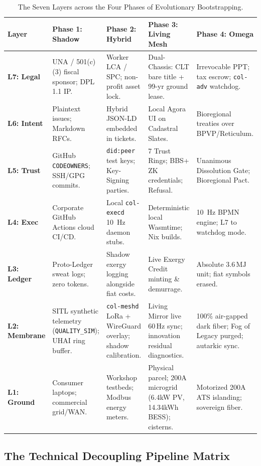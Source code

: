 \begin{table}[htbp]
\centering
\small
\setlength{\tabcolsep}{3pt}
\begin{tabular}{|p{}|p{}|p{}|p{}|p{}|}
\hline
\textbf{Layer} & \textbf{Phase 1: Shadow} & \textbf{Phase 2: Hybrid} & \textbf{Phase 3: Living Mesh} & \textbf{Phase 4: Omega} \\
\hline
\textbf{L7: Legal} & UNA / 501(c)(3) fiscal sponsor; DPL 1.1 IP. & Worker LCA / SPC; non-profit asset lock. & Dual-Chassis: CLT bare title + 99-yr ground lease. & Irrevocable PPT; tax escrow; \texttt{col-adv} watchdog. \\
\hline
\textbf{L6: Intent} & Plaintext issues; Markdown RFCs. & Hybrid JSON-LD embedded in tickets. & Local Agora UI on Cadastral Slates. & Bioregional treaties over BPVP/Reticulum. \\
\hline
\textbf{L5: Trust} & GitHub \texttt{CODEOWNERS}; SSH/GPG commits. & \texttt{did:peer} test keys; Key-Signing parties. & 7 Trust Rings; BBS+ ZK credentials; Refusal. & Unanimous Dissolution Gate; Bioregional Pact. \\
\hline
\textbf{L4: Exec} & Corporate GitHub Actions cloud CI/CD. & Local \texttt{col-execd} 10~Hz daemon stubs. & Deterministic local Wasmtime; Nix builds. & 10~Hz BPMN engine; L7 to watchdog mode. \\
\hline
\textbf{L3: Ledger} & Proto-Ledger sweat logs; zero tokens. & Shadow exergy logging alongside fiat costs. & Live Exergy Credit minting \& demurrage. & Absolute $3.6\,\mathrm{MJ}$ unit; fiat symbols erased. \\
\hline
\textbf{L2: Membrane} & SITL synthetic telemetry (\texttt{QUALITY\_SIM}); UHAI ring buffer. & \texttt{col-meshd} LoRa + WireGuard overlay; shadow calibration. & Living Mirror live 60\,Hz sync; innovation residual diagnostics. & 100\% air-gapped dark fiber; Fog of Legacy purged; autarkic sync. \\
\hline
\textbf{L1: Ground} & Consumer laptops; commercial grid/WAN. & Workshop testbeds; Modbus energy meters. & Physical parcel; 200A microgrid (6.4kW PV, 14.34kWh BESS); cisterns. & Motorized 200A ATS islanding; sovereign fiber. \\
\hline
\end{tabular}
\caption{The Seven Layers across the Four Phases of Evolutionary Bootstrapping.}
\label{tab:bootstrapping_layers}
\end{table}

\subsection{The Technical Decoupling Pipeline Matrix}
\label{subsec:decoupling_pipeline}

